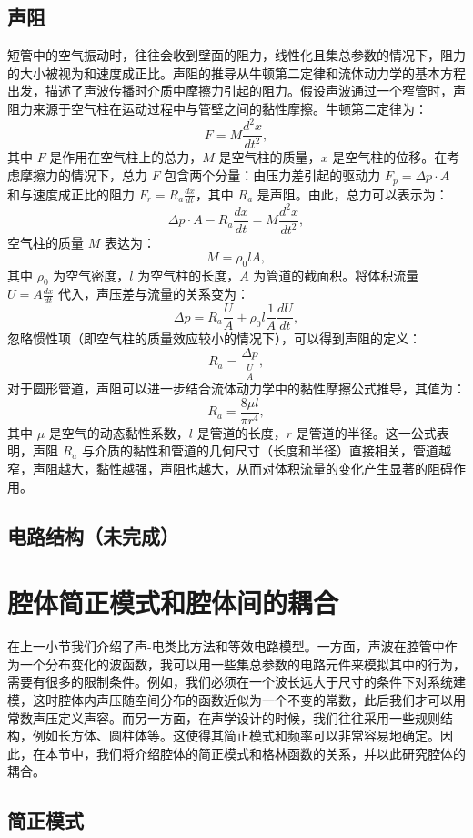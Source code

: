 \subsection{声阻}
短管中的空气振动时，往往会收到壁面的阻力，线性化且集总参数的情况下，阻力的大小被视为和速度成正比。声阻的推导从牛顿第二定律和流体动力学的基本方程出发，描述了声波传播时介质中摩擦力引起的阻力。假设声波通过一个窄管时，声阻力来源于空气柱在运动过程中与管壁之间的黏性摩擦。牛顿第二定律为：
\begin{equation} \label{eq2-19}
  F = M \frac{d^2 x}{dt^2},
\end{equation}
其中 \( F \) 是作用在空气柱上的总力，\( M \) 是空气柱的质量，\( x \) 是空气柱的位移。在考虑摩擦力的情况下，总力 \( F \) 包含两个分量：由压力差引起的驱动力 \( F_p = \Delta p \cdot A \) 和与速度成正比的阻力 \( F_r = R_a \frac{dx}{dt} \)，其中 \( R_a \) 是声阻。由此，总力可以表示为：
\begin{equation} \label{eq2-20}
  \Delta p \cdot A - R_a \frac{dx}{dt} = M \frac{d^2 x}{dt^2},
\end{equation}
空气柱的质量 \( M \) 表达为：
\begin{equation} \label{eq2-21}
  M = \rho_0 l A,
\end{equation}
其中 \( \rho_0 \) 为空气密度，\( l \) 为空气柱的长度，\( A \) 为管道的截面积。将体积流量 \( U = A \frac{dx}{dt} \) 代入，声压差与流量的关系变为：
\begin{equation} \label{eq2-22}
  \Delta p = R_a \frac{U}{A} + \rho_0 l \frac{1}{A} \frac{dU}{dt},
\end{equation}
忽略惯性项（即空气柱的质量效应较小的情况下），可以得到声阻的定义：
\begin{equation} \label{eq2-23}
  R_a = \frac{\Delta p}{\frac{U}{A}},
\end{equation}
对于圆形管道，声阻可以进一步结合流体动力学中的黏性摩擦公式推导，其值为：
\begin{equation} \label{eq2-24}
  R_a = \frac{8 \mu l}{\pi r^4},
\end{equation}
其中 \( \mu \) 是空气的动态黏性系数，\( l \) 是管道的长度，\( r \) 是管道的半径。这一公式表明，声阻 \( R_a \) 与介质的黏性和管道的几何尺寸（长度和半径）直接相关，管道越窄，声阻越大，黏性越强，声阻也越大，从而对体积流量的变化产生显著的阻碍作用。

\subsection{电路结构（未完成）}

 \section{腔体简正模式和腔体间的耦合}
 在上一小节我们介绍了声-电类比方法和等效电路模型。一方面，声波在腔管中作为一个分布变化的波函数，我可以用一些集总参数的电路元件来模拟其中的行为，需要有很多的限制条件。例如，我们必须在一个波长远大于尺寸的条件下对系统建模，这时腔体内声压随空间分布的函数近似为一个不变的常数，此后我们才可以用常数声压定义声容。而另一方面，在声学设计的时候，我们往往采用一些规则结构，例如长方体、圆柱体等。这使得其简正模式和频率可以非常容易地确定。因此，在本节中，我们将介绍腔体的简正模式和格林函数的关系，并以此研究腔体的耦合。

\subsection{简正模式}


